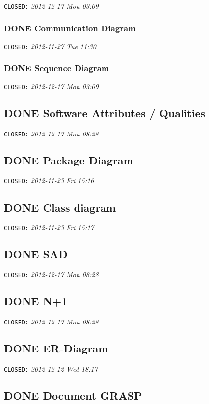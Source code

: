 \documentclass[11pt,a4paper]{article}
\begin{document}
   \texttt{CLOSED:} \textit{2012-12-17 Mon 03:09}
\subsubsection{\textbf{DONE} Communication Diagram}
\label{sec-1-9-1}

    \texttt{CLOSED:} \textit{2012-11-27 Tue 11:30}
\subsubsection{\textbf{DONE} Sequence Diagram}
\label{sec-1-9-2}

    \texttt{CLOSED:} \textit{2012-12-17 Mon 03:09}
\subsection{\textbf{DONE} Software Attributes / Qualities}
\label{sec-1-10}

   \texttt{CLOSED:} \textit{2012-12-17 Mon 08:28}
\subsection{\textbf{DONE} Package Diagram}
\label{sec-1-11}

   \texttt{CLOSED:} \textit{2012-11-23 Fri 15:16}
\subsection{\textbf{DONE} Class diagram}
\label{sec-1-12}

   \texttt{CLOSED:} \textit{2012-11-23 Fri 15:17}
\subsection{\textbf{DONE} SAD}
\label{sec-1-13}

   \texttt{CLOSED:} \textit{2012-12-17 Mon 08:28}
\subsection{\textbf{DONE} N+1}
\label{sec-1-14}

   \texttt{CLOSED:} \textit{2012-12-17 Mon 08:28}
\subsection{\textbf{DONE} ER-Diagram}
\label{sec-1-15}

   \texttt{CLOSED:} \textit{2012-12-12 Wed 18:17}
\subsection{\textbf{DONE} Document GRASP}
\label{sec-1-16}
\end{document}
